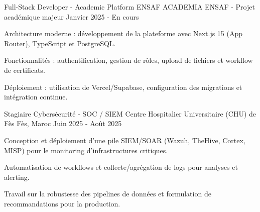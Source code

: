 
\begin{cventries}

    \cventry
    {Full-Stack Developer - Academic Platform} %
    {ENSAF ACADEMIA} %
    {ENSAF - Projet académique majeur} %
    {Janvier 2025 - En cours} %
    {
        \begin{cvitems}
            \item {Architecture moderne : développement de la plateforme avec Next.js 15 (App Router), TypeScript et PostgreSQL.}
            \item {Fonctionnalités : authentification, gestion de rôles, upload de fichiers et workflow de certificats.}
            \item {Déploiement : utilisation de Vercel/Supabase, configuration des migrations et intégration continue.}
        \end{cvitems}
    }

    \cventry
    {Stagiaire Cybersécurité - SOC / SIEM} %
    {Centre Hospitalier Universitaire (CHU) de Fès} %
    {Fès, Maroc} %
    {Juin 2025 - Août 2025} %
    {
        \begin{cvitems}
            \item {Conception et déploiement d'une pile SIEM/SOAR (Wazuh, TheHive, Cortex, MISP) pour le monitoring d'infrastructures critiques.}
            \item {Automatisation de workflows et collecte/agrégation de logs pour analyses et alerting.}
            \item {Travail sur la robustesse des pipelines de données et formulation de recommandations pour la production.}
        \end{cvitems}
    }


\end{cventries}